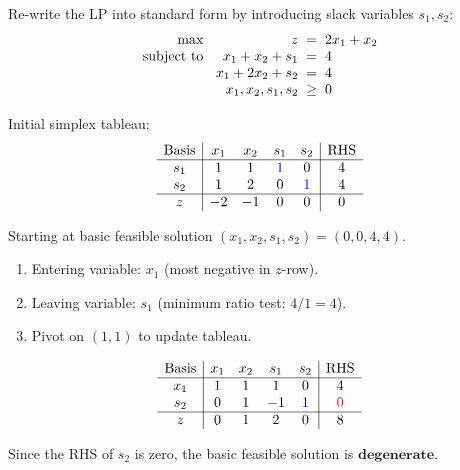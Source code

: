 \documentclass[a4paper, 10pt]{article}
\begin{document}
\begin{solution}
Re-write the LP into standard form by introducing slack variables \(s_1, s_2\):
\[
\begin{array}{@{\hspace{2mm}} r @{\hspace{2mm}} r @{\hspace{2mm}} c @{\hspace{2mm}} l}
    \text{max } & z & = & 2x_1 + x_2 \\
    \text{subject to } & x_1 + x_2 + s_1 & = & 4 \\
    & x_1 + 2x_2 + s_2 & = & 4 \\
    & x_1, x_2, s_1, s_2 & \geq & 0
\end{array}
\]

Initial simplex tableau:
\[
\begin{array}{c|cccc|c}
    \text{Basis} & x_1 & x_2 & s_1 & s_2 & \text{RHS} \\
    \hline
    s_1 & 1 & 1 & \textcolor[HTML]{0000FF}{1} & 0 & 4 \\
    s_2 & 1 & 2 & 0 & \textcolor[HTML]{0000FF}{1} & 4 \\
    \hline
    z & -2 & -1 & 0 & 0 & 0 \\
\end{array}
\]

Starting at basic feasible solution \( (x_1, x_2, s_1, s_2) = (0, 0, 4, 4) \).
\begin{enumerate}
    \item Entering variable: \( x_1 \) (most negative in \( z \)-row).
    \item Leaving variable: \( s_1 \) (minimum ratio test: \( 4/1 = 4 \)).
    \item Pivot on \( (1,1) \) to update tableau.
\end{enumerate}
\[
\begin{array}{c|cccc|c}
    \text{Basis} & x_1 & x_2 & s_1 & s_2 & \text{RHS} \\
    \hline
    x_1 & \textcolor[HTML]{0000FF}{1} & 1 & 1 & 0 & 4 \\
    s_2 & 0 & 1 & -1 & \textcolor[HTML]{0000FF}{1} & \textcolor[HTML]{FF0000}{0} \\
    \hline
    z & 0 & 1 & 2 & 0 & 8 \\
\end{array}
\]

Since the RHS of \( s_2 \) is zero, the basic feasible solution is \( \boxed{\textbf{degenerate}} \).
\end{solution}
\end{document}
